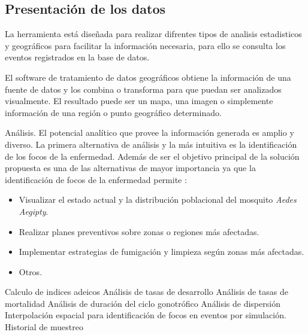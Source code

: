 \subsection{Presentación de los datos}
La herramienta está diseñada para realizar difrentes tipos de analisis estadisticos y geográficos
para facilitar la información necesaria, para ello se consulta los eventos registrados en la base
de datos.

El software de tratamiento de datos geográficos obtiene la información de una fuente
de datos y los combina o transforma para que puedan ser analizados visualmente. El
resultado puede ser un mapa, una imagen o simplemente información de una región o
punto geográfico determinado.

Análisis. El potencial analítico que provee la información generada es amplio y diverso. La
primera alternativa de análisis y la más intuitiva es la identificación de los focos de la
enfermedad. Además de ser el objetivo principal de la solución propuesta es una de las
alternativas de mayor importancia ya que la identificación de focos de la enfermedad permite :
    \begin{itemize}
        \item Visualizar el estado actual y la distribución poblacional del mosquito \textit{Aedes Aegipty}.
        \item Realizar planes preventivos sobre zonas o regiones más afectadas.
        \item Implementar estrategias de fumigación y limpieza según zonas más afectadas.
        \item Otros.
    \end{itemize}

Calculo de indices adeicos
Análisis de tasas de desarrollo
Análisis de tasas de mortalidad
Análisis de duración del ciclo gonotrófico
Análisis de dispersión
Interpolación espacial para identificación de focos en eventos por simulación.
Historial de muestreo
